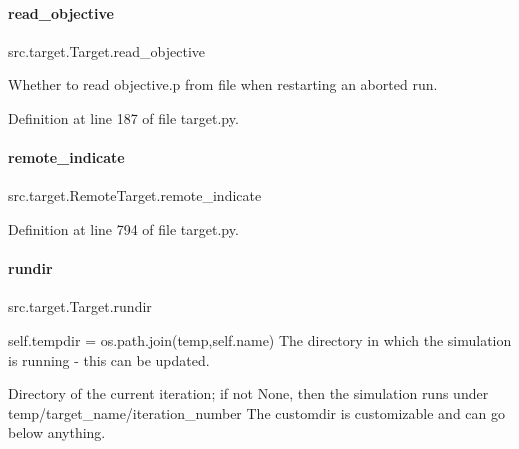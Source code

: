 \paragraph{\texorpdfstring{read\+\_\+objective}{read\_objective}}
{\footnotesize\ttfamily src.\+target.\+Target.\+read\+\_\+objective\hspace{0.3cm}{\ttfamily [inherited]}}



Whether to read objective.\+p from file when restarting an aborted run. 



Definition at line 187 of file target.\+py.

\mbox{\label{classsrc_1_1target_1_1RemoteTarget_adfedcf928644b8e2df960bc06f8a3276}} 
\paragraph{\texorpdfstring{remote\+\_\+indicate}{remote\_indicate}}
{\footnotesize\ttfamily src.\+target.\+Remote\+Target.\+remote\+\_\+indicate}



Definition at line 794 of file target.\+py.

\mbox{\label{classsrc_1_1target_1_1Target_a9f47e2d3fd02ea26469e880350bdb976}} 
\paragraph{\texorpdfstring{rundir}{rundir}}
{\footnotesize\ttfamily src.\+target.\+Target.\+rundir\hspace{0.3cm}{\ttfamily [inherited]}}



self.\+tempdir = os.\+path.\+join(\textquotesingle{}temp\textquotesingle{},self.\+name) The directory in which the simulation is running -\/ this can be updated. 

Directory of the current iteration; if not None, then the simulation runs under temp/target\+\_\+name/iteration\+\_\+number The \textquotesingle{}customdir\textquotesingle{} is customizable and can go below anything.

